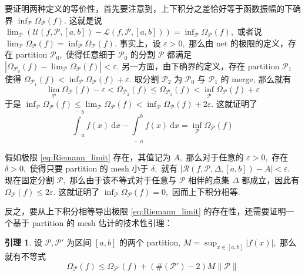 \documentclass[12pt, a4paper, oneside]{book}
\numberwithin{figure}{section}
\theoremstyle{definition}
\newtheorem{lemma}[theorem]{引理}
\begin{document}
要证明两种定义的等价性，首先要注意到，上下积分之差恰好等于函数振幅的下确界 $\inf_{\mathcal P}\Omega_\mathcal P(f).$ 这就是说 $\lim_{\mathcal P} (\mathcal U(f,\mathcal P,[a,b])-\mathcal L(f,\mathcal P,[a,b]))=\inf_{\mathcal P}\Omega_\mathcal P(f),$ 或者说 $\lim_{\mathcal P}\Omega_\mathcal P(f)=\inf_{\mathcal P}\Omega_\mathcal P(f).$ 
事实上，设 $\varepsilon>0,$ 那么由 net 的极限的定义，存在 partition $\mathcal P_0,$ 使得任意细于 $\mathcal P_0$ 的分割 $\mathcal P$ 都满足 $|\Omega_{\mathcal P_0}(f)-\lim_{\mathcal P} \Omega_{\mathcal P}(f)|<\varepsilon.$ 
另一方面，由下确界的定义，存在 partition $\mathcal P_1$ 使得 $\Omega_{\mathcal P_1}(f)< \inf_{\mathcal P}\Omega_{\mathcal P}(f)+\varepsilon.$
取分割 $\mathcal P_2$ 为 $\mathcal P_0$ 与 $\mathcal P_1$ 的 merge, 那么就有 
\begin{equation}
    \lim_{\mathcal P}\Omega_{\mathcal P}(f)-\varepsilon< \Omega_{\mathcal P_2}(f)\leq \Omega_{\mathcal P_1}(f)<\inf_{\mathcal P}\Omega_{\mathcal P}(f)+\varepsilon
\end{equation}
于是 $\inf_{\mathcal P}\Omega_{\mathcal P}(f)\leq \lim_{\mathcal P}\Omega_{\mathcal P}(f)<\inf_{\mathcal P}\Omega_{\mathcal P}(f)+2\varepsilon.$ 这就证明了 
\begin{equation}
    \overline{\int}_a^b f(x)\ \mathrm dx - \underline{\int}_a^b f(x)\ \mathrm dx = \inf_{\mathcal P}\Omega_{\mathcal P}(f)
\end{equation}

假如极限 \eqref{eq:Riemann_limit} 存在，其值记为 $A,$ 那么对于任意的 $\varepsilon>0,$ 存在 $\delta>0,$ 使得只要 partition 的 mesh 小于 $\delta,$ 就有 $|\mathcal R(f,\mathcal P,\Delta,[a,b])-A|<\varepsilon.$ 
现在固定分割 $\mathcal P,$ 那么由于该不等式对于任意与 $\mathcal P$ 相伴的点集 $\Delta$ 都成立，因此有 $\Omega_{\mathcal P}(f)\leq 2\varepsilon.$ 这就证明了 $\inf_{\mathcal P}\Omega_{\mathcal P}(f)=0,$ 因而上下积分相等. 

反之，要从上下积分相等导出极限 \eqref{eq:Riemann_limit} 的存在性，还需要证明一个基于 partition 的 mesh 估计的技术性引理：
\begin{lemma}\label{lemma:mesh estimate}
    设 $\mathcal P,\mathcal P'$ 为区间 $[a,b]$ 的两个 partition, $M=\sup_{x\in [a,b]}|f(x)|,$ 那么就有不等式 
    \begin{equation}\label{eq:mesh estimate}
        \Omega_{\mathcal P}(f) \leq \Omega_{\mathcal P'}(f) + (\#(\mathcal P')-2)M\|\mathcal P\|
    \end{equation}
\end{lemma}
\end{document}
